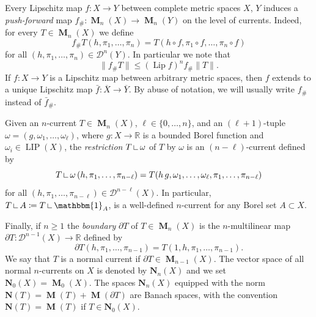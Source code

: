 \documentclass[reqno]{amsart}
\numberwithin{equation}{section}
\newcommand{\R}{\mathbb{R}}
\newcommand{\Lip}{\operatorname{Lip}}
\newcommand{\LIP}{\operatorname{LIP}}
\newcommand{\norm}[1]{\lVert#1\rVert}
\newcommand{\on}{\:\mbox{\rule{0.1ex}{1.2ex}\rule{1.1ex}{0.1ex}}\:}
\DeclareMathOperator{\mass}{\mathbf{M}}
\begin{document}
Every Lipschitz map \(f\colon X\to Y\) between complete metric spaces \(X\), \(Y\) induces a \emph{push-forward} map \(f_\# \colon \mass_n(X) \to \mass_n(Y)\) on the level of currents. Indeed, for every \(T\in \mass_n(X)\) we define
\[
f_\# T(h, \pi_1, \dots, \pi_n)=T(h\circ f, \pi_1\circ f, \dots, \pi_n \circ f)
\]
for all $(h, \pi_1, \dots, \pi_n)\in \mathcal{D}^n(Y)$. In particular we note that 
\begin{equation}
\label{eq:mass-pf-inequality}
\norm{f_{\#}T}\leq (\Lip f)^n f_{\#}\norm{T}.
\end{equation}
If $f\colon X\to Y$ is a Lipschitz map between arbitrary metric spaces, then $f$ extends to a unique Lipschitz map $\bar{f}\colon \overline{X}\to\overline{Y}$. By abuse of notation, we will usually write $f_\#$ instead of $\bar{f}_\#$.

Given an $n$-current $T\in \mass_n(X)$, \(\ell\in \{0, \dots, n\}\), and an $(\ell+1)$-tuple \(\omega=(g, \omega_1, \dots, \omega_{\ell})\), where \(g\colon X\to \R\) is a bounded Borel function and \(\omega_i\in \LIP(X)\), the \emph{restriction} $T\on\omega$ of $T$ by $\omega$ is an \((n-\ell)\)-current defined by
\[
T \on \omega \,(h, \pi_1, \dots, \pi_{n-\ell})=T(h \, g, \omega_1, \dots, \omega_{\ell}, \pi_1, \dots, \pi_{n-\ell})
\]
for all \((h, \pi_1, \dots, \pi_{n-\ell})\in \mathcal{D}^{n-\ell}(X)\). In particular, \(T\on A \coloneqq T \on \mathbbm{1}_A\), is a well-defined \(n\)-current for any Borel set \(A\subset X\).

Finally, if \(n\geq 1\) the \emph{boundary} \(\partial T\) of \(T\in \mass_n(X)\) is the \(n\)-multilinear map \(\partial T \colon \mathcal{D}^{n-1}(X)\to \R\) defined by
\[
\partial T(h, \pi_1, \dots, \pi_{n-1})=T(1, h, \pi_1, \dots, \pi_{n-1}).
\]
We say that \(T\) is a normal current if $\partial T\in \mass_{n-1}(X)$. The vector space of all normal \(n\)-currents on \(X\) is denoted by \(\mathbf{N}_n(X)\) and we set \(\mathbf{N}_0(X)=\mass_0(X)\). The spaces $\mathbf{N}_n(X)$ equipped with the norm \(\mathbf{N}(T)=\mass(T)+\mass(\partial T)\) are Banach spaces, with the convention \(\mathbf{N}(T)=\mass(T)\) if \(T\in \mathbf{N}_0(X)\). 
\end{document}
